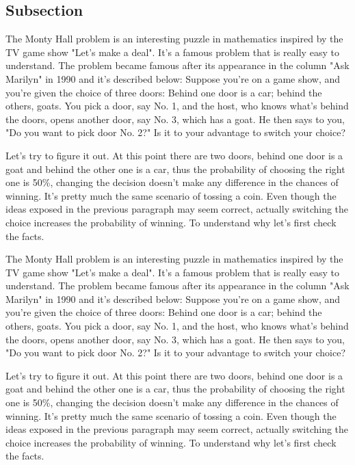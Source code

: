 \documentclass[preprint]{oscmjournal}
\begin{document}
\subsection{Subsection}
The Monty Hall problem is an interesting puzzle in mathematics inspired by the TV  game show "Let's make a deal". It's a famous problem that is really easy to understand. The problem became famous after its appearance in the column "Ask Marilyn" in 1990 and  it's described below: Suppose you're on a game show, and you're given the choice of three doors: Behind one  door is a car; behind the others, goats. You pick a door, say No. 1, and the host, who  knows what's behind the doors, opens another door, say No. 3, which has a goat. He then  says to you, "Do you want to pick door No. 2?" Is it to your advantage to switch your choice?

Let's try to figure it out. At this point there are two doors, behind one door is a goat  and behind the other one is a car, thus the probability of choosing the right one is 50\%, changing the decision doesn't make any difference in the chances of winning. It's pretty much the same scenario of tossing a coin. Even though the ideas exposed in the previous paragraph may seem correct, actually switching the choice increases the probability of winning. To understand why let's  first check the facts.

The Monty Hall problem is an interesting puzzle in mathematics inspired by the TV  game show "Let's make a deal". It's a famous problem that is really easy to understand. The problem became famous after its appearance in the column "Ask Marilyn" in 1990 and  it's described below: Suppose you're on a game show, and you're given the choice of three doors: Behind one  door is a car; behind the others, goats. You pick a door, say No. 1, and the host, who  knows what's behind the doors, opens another door, say No. 3, which has a goat. He then  says to you, "Do you want to pick door No. 2?" Is it to your advantage to switch your choice?

Let's try to figure it out. At this point there are two doors, behind one door is a goat  and behind the other one is a car, thus the probability of choosing the right one is 50\%, changing the decision doesn't make any difference in the chances of winning. It's pretty much the same scenario of tossing a coin. Even though the ideas exposed in the previous paragraph may seem correct, actually switching the choice increases the probability of winning. To understand why let's  first check the facts.
\end{document}
